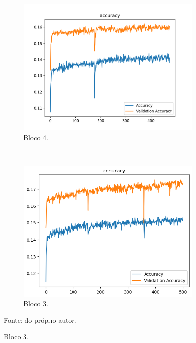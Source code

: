 \begin{figure}[H]
     \begin{subfigure}[t]{0.45\textwidth}
         \centering
         \includegraphics[width=1\linewidth]{recursos/imagens/results/cifar_accuracy2.png}
         \caption{Bloco 4.}
         \label{results:fig:datasets:1.3}
     \end{subfigure}
     ~
     \begin{subfigure}[t]{0.45\textwidth}
         \centering
         \includegraphics[width=1\linewidth]{recursos/imagens/results/cifar_accuracy3.png}
         \caption{Bloco 3.}
         \label{results:fig:datasets:1.4}
     \end{subfigure}
     
     Fonte: do próprio autor.
 \end{figure}

